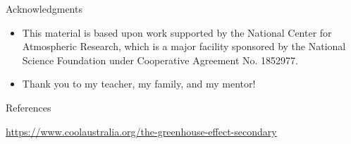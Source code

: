 \documentclass[aspectratio=1610]{beamer}
\begin{document}
\begin{frame}{Acknowledgments}
  \begin{itemize}
  \item This material is based upon work supported by the National Center for Atmospheric Research, which is a major facility sponsored by the National Science Foundation under Cooperative Agreement No. 1852977.
  \item Thank you to my teacher, my family, and my mentor!
  \end{itemize}
\end{frame}

\begin{frame}{References}
  
  \fontsize{6pt}{5}\selectfont
  
  \url{https://www.coolaustralia.org/the-greenhouse-effect-secondary}
\end{frame}
\end{document}
